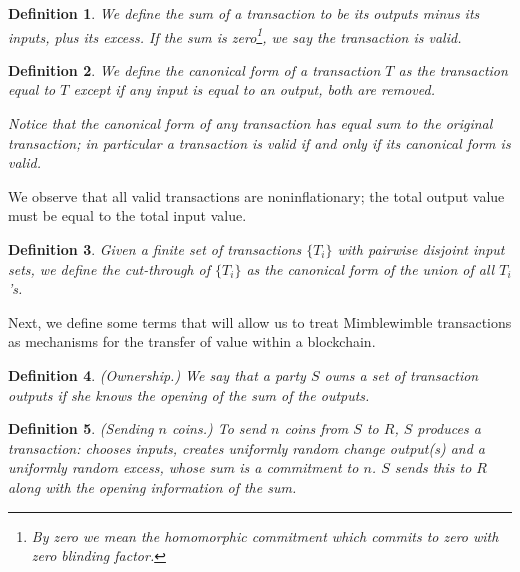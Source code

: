 \documentclass[letterpaper]{article}
\newtheorem{lmma}{Lemma}
\newtheorem{defn}{Definition}
\begin{document}
\begin{defn} We define the \emph{sum} of a transaction to be its
outputs minus its inputs, plus its excess. If the sum is zero\footnote{By
zero we mean the homomorphic commitment which commits to zero with
zero blinding factor.}, we say the transaction is \emph{valid}.
\end{defn}

\begin{defn} We define the \emph{canonical form} of a transaction
$T$ as the transaction equal to $T$ except if any input is equal
to an output, both are removed.

Notice that the canonical form of any transaction has equal sum
to the original transaction; in particular a transaction is valid
if and only if its canonical form is valid.\end{defn}

We observe that all valid transactions are noninflationary; the
total output value must be equal to the total input value.

\begin{defn} Given a finite set of transactions $\{T_i\}$ with
pairwise disjoint input sets, we define the \emph{cut-through}
of $\{T_i\}$ as the canonical form of the union of all $T_i$'s.
\end{defn}

Next, we define some terms that will allow us to treat Mimblewimble
transactions as mechanisms for the transfer of value within a blockchain.
\begin{defn} (Ownership.) We say that a party $S$ \emph{owns} a set
of transaction outputs if she knows the opening of the sum of the
outputs.\end{defn}

\begin{defn} (Sending $n$ coins.) To send $n$ coins from $S$
to $R$, $S$ produces a transaction: chooses inputs, creates uniformly
random change output(s) and a uniformly random excess, whose sum is
a commitment to $n$. $S$ sends this to $R$ along with the opening
information of the sum.
\label{send}
\end{defn}

\end{document}
